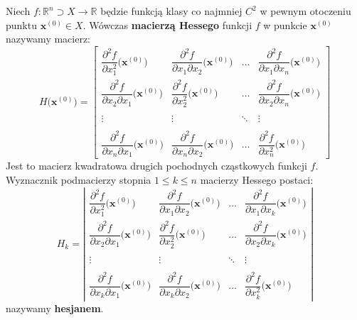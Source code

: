 \begin{df}
Niech $f:\mathbb{R}^n\supset X\rightarrow\mathbb{R}$ będzie funkcją klasy co najmniej $C^2$ w pewnym otoczeniu punktu $\textbf{x}^{(0)}\in X$. Wówczas \textbf{macierzą Hessego} funkcji $f$ w punkcie $\textbf{x}^{(0)}$ nazywamy macierz:
$$H\big(\textbf{x}^{(0)}\big)=\left[ \begin{array}{cccc}
\dfrac{\partial^2f}{\partial x_1^2}\big(\textbf{x}^{(0)}\big) & \dfrac{\partial^2f}{\partial x_1\partial x_2}\big(\textbf{x}^{(0)}\big) & \ldots & \dfrac{\partial^2f}{\partial x_1\partial x_n}\big(\textbf{x}^{(0)}\big)\\
\dfrac{\partial^2f}{\partial x_2\partial x_1}\big(\textbf{x}^{(0)}\big) & \dfrac{\partial^2f}{\partial x_2^2}\big(\textbf{x}^{(0)}\big) & \ldots & \dfrac{\partial^2f}{\partial x_2\partial x_n}\big(\textbf{x}^{(0)}\big)\\
\\
\vdots & \vdots & \ddots & \vdots\\
\\
\dfrac{\partial^2f}{\partial x_n\partial x_1}\big(\textbf{x}^{(0)}\big) & \dfrac{\partial^2f}{\partial x_n\partial x_2}\big(\textbf{x}^{(0)}\big) & \ldots & \dfrac{\partial^2f}{\partial x_n^2}\big(\textbf{x}^{(0)}\big)
\end{array} \right]$$
Jest to macierz kwadratowa drugich pochodnych cząstkowych funkcji $f$. Wyznacznik podmacierzy stopnia $1\leqslant k\leqslant n$ macierzy Hessego postaci:
$$H_k=\left| \begin{array}{cccc}
\dfrac{\partial^2f}{\partial x_1^2}\big(\textbf{x}^{(0)}\big) & \dfrac{\partial^2f}{\partial x_1\partial x_2}\big(\textbf{x}^{(0)}\big) & \ldots & \dfrac{\partial^2f}{\partial x_1\partial x_k}\big(\textbf{x}^{(0)}\big)\\
\dfrac{\partial^2f}{\partial x_2\partial x_1}\big(\textbf{x}^{(0)}\big) & \dfrac{\partial^2f}{\partial x_2^2}\big(\textbf{x}^{(0)}\big) & \ldots & \dfrac{\partial^2f}{\partial x_2\partial x_k}\big(\textbf{x}^{(0)}\big)\\
\\
\vdots & \vdots & \ddots & \vdots\\
\\
\dfrac{\partial^2f}{\partial x_k\partial x_1}\big(\textbf{x}^{(0)}\big) & \dfrac{\partial^2f}{\partial x_k\partial x_2}\big(\textbf{x}^{(0)}\big) & \ldots & \dfrac{\partial^2f}{\partial x_k^2}\big(\textbf{x}^{(0)}\big)
\end{array} \right|$$
nazywamy \textbf{hesjanem}.
\end{df}

